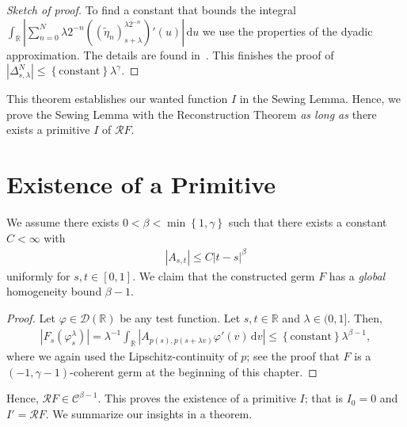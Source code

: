 \begin{proof}[Sketch of proof]
  To find a constant that bounds the integral \( \int_{\mathbb{R}} |\sum^N_{n=0} \lambda 2^{-n} ((\tilde \eta_n)_{s + \lambda}^{\lambda 2^{-n}})'(u)| \, \mathrm{d}u \) we use the properties of the dyadic approximation. The details are found in~\cite[Proposition 5.3]{broux2021sewing}. This finishes the proof of \( |\Delta^N_{s, \lambda}| \leq \left\{ \mathrm{constant} \right\} \lambda^\gamma \).
\end{proof}

This theorem establishes our wanted function \( I \) in the Sewing Lemma. Hence, we prove the Sewing Lemma with the Reconstruction Theorem \emph{as long as} there exists a primitive \( I \) of \( \mathcal{R}F \).

\section*{Existence of a Primitive}

We assume there exists \( 0 < \beta < \min\left\{ 1, \gamma \right\} \) such that there exists a constant \( C < \infty \) with
\begin{align*}
  |A_{s,t} | \leq C |t-s|^\beta
\end{align*}
uniformly for \( s,t \in [0,1] \). We claim that the constructed germ \( F \) has a \emph{global} homogeneity bound \( \beta - 1 \). 

\begin{proof}
  Let \( \varphi \in \mathcal{D}(\mathbb{R}) \) be any test function. Let \( s,t \in \mathbb{R} \) and \( \lambda \in (0,1] \). Then, 
  \begin{align*}
    |F_s(\varphi^\lambda_s)| = \lambda^{-1} \int_{\mathbb{R}} |A_{p(s), p(s + \lambda v)} \varphi'(v) \, \mathrm{d}v| \leq \left\{ \mathrm{constant} \right\} \lambda^{\beta - 1},
  \end{align*}
  where we again used the Lipschitz-continuity of \( p \); see the proof that \( F \) is a \( (-1, \gamma - 1) \)-coherent germ at the beginning of this chapter. 
\end{proof}

Hence, \( \mathcal{R}F \in \mathcal{C}^{\beta - 1} \). This proves the existence of a primitive \( I \); that is \( I_0 = 0 \) and \( I' = \mathcal{R}F \). We summarize our insights in a theorem.


